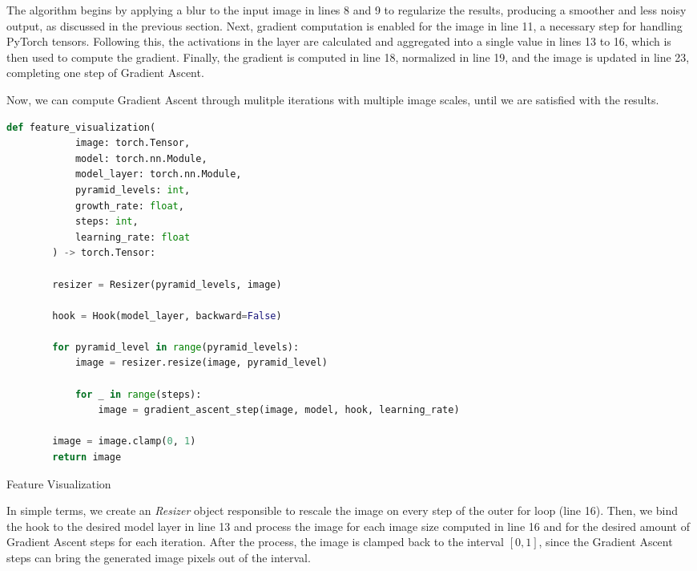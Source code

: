 \noindent The algorithm begins by applying a blur to the input image in lines 8 and 9 to regularize the results, producing a smoother and less noisy output, as discussed in the previous section.
Next, gradient computation is enabled for the image in line 11, a necessary step for handling PyTorch tensors.
Following this, the activations in the layer are calculated and aggregated into a single value in lines 13 to 16, which is then used to compute the gradient.
Finally, the gradient is computed in line 18, normalized in line 19, and the image is updated in line 23, completing one step of Gradient Ascent.

\newpage
Now, we can compute Gradient Ascent through mulitple iterations with multiple image scales, until we are satisfied with the results. 

\begin{program}
    \centering
    \label{code:feat_visualization}

    \begin{lstlisting}[language=Python, style=wider]
        def feature_visualization(
            image: torch.Tensor,
            model: torch.nn.Module,
            model_layer: torch.nn.Module,
            pyramid_levels: int,
            growth_rate: float,
            steps: int,
            learning_rate: float
        ) -> torch.Tensor: 
        
        resizer = Resizer(pyramid_levels, image)

        hook = Hook(model_layer, backward=False)
        
        for pyramid_level in range(pyramid_levels):
            image = resizer.resize(image, pyramid_level)

            for _ in range(steps):
                image = gradient_ascent_step(image, model, hook, learning_rate)
            
        image = image.clamp(0, 1)
        return image
    \end{lstlisting}

    \caption{Feature Visualization}
\end{program}

In simple terms, we create an \emph{Resizer} object responsible to rescale the image on every step of the outer for loop (line 16). 
Then, we bind the hook to the desired model layer in line 13 and process the image for each image size computed in line 16 and for the desired amount of Gradient Ascent steps for each iteration.
After the process, the image is clamped back to the interval \([0, 1]\), since the Gradient Ascent steps can bring the generated image pixels out of the interval.


